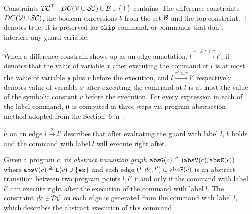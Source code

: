 \begin{defn}[Constraints]
  Constraints $\mathcal{DC}^{\top}: DC(\mathcal{V}  \cup \mathcal{SC}) \cup \mathcal{B}\cup \{\top\}$  contains:
  The difference constraints $DC(\mathcal{V}  \cup \mathcal{SC})$, the boolean expressions $b$ from the set $\mathcal{B}$
  and the top constraint, $\top$ denotes true. It is preserved for $\mathtt{skip}$ command,
  or commands that don't interfere any guard variable.
\end{defn}
When a difference constrain shows up as an edge annotation, $l \xrightarrow{x' \leq y + v} l'$,
it denotes that
the value of variable $x$
after executing the command at $l$ is at most
the value of variable $y$ plus $v$ before the execution,
and $l \xrightarrow{x' \leq v} l'$ respectively denotes value of variable $x$
after executing the command at $l$ is at most
the value of the symbolic constant $v$ before the execution.
For every expression in each of the label command, it is computed in three steps via program abstraction method adopted from the Section~6 in~\cite{SinnZV17}. 

$b$ on an edge $l \xrightarrow{b} l'$ describes
that after evaluating the guard with label $l$,
$b$ holds and the command with label $l$ will execute right after.

\begin{defn}
  \label{def:abs_cfg}
  Given a program $c$, 
  its \emph{abstract transition graph} $\mathtt{abs}{\mathtt{G}}(c) \triangleq (\mathtt{abs}{\mathtt{V}}(c), \mathtt{abs}{\mathtt{E}}(c))$ where
  $\mathtt{abs}{\mathtt{V}}(c) \triangleq \mathtt{L}(c)\cup\{\mathtt{ex}\}$
  and 
  each edge $(l, dc, l') \in \mathtt{abs}{\mathtt{E}}(c)$ is an abstract transition
between two program points $l, l'$ if and only if
the command with label $l'$ can execute right after the execution of the command with label $l$.
The constraint $dc \in \mathcal{DC}$ on each edge is generated from the command with label $l$, which describes the abstract execution of this command.
\end{defn}

